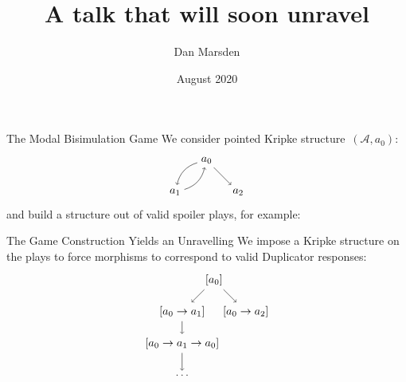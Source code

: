 \documentclass{beamer}
\title{A talk that will soon unravel}
\author{Dan Marsden}
\date{August 2020}
\newcommand{\As}{\mathcal{A}}
\begin{document}
\begin{frame}
\maketitle
\end{frame}

\begin{frame}{The Modal Bisimulation Game}
    We consider pointed Kripke structure~$(\As, a_0)$:
    \begin{equation*}
        \begin{tikzpicture}
        \path node(a0) {$a_0$} +(-1,-1) node (a1) {$a_1$} +(1,-1) node(a2) {$a_2$};
        \path[->] 
        (a0) edge[bend right] (a1)
        (a1) edge[bend right] (a0)
        (a0) edge (a2);
        \end{tikzpicture}
    \end{equation*}
    and build a structure out of valid spoiler plays, for example:
    \begin{equation*}
        [a_0 \rightarrow a_1 \rightarrow a_0 \rightarrow a_2]
    \end{equation*}
\end{frame}

\begin{frame}{The Game Construction Yields an Unravelling}
    We impose a Kripke structure on the plays to force morphisms to correspond to valid Duplicator responses:
    \begin{equation*}
        \begin{tikzpicture}
        \path 
        node (a) {$[a_0]$} +(-1,-1) 
        node (b) {$[a_0 \rightarrow a_1]$} ++(1,-1)
        node (c) {$[a_0 \rightarrow a_2]$} (b) ++(0,-1)
        node (a') {$[a_0 \rightarrow a_1 \rightarrow a_0]$} ++(0,-1)
        node (dots) {$\ldots$};
        \path[->]
        (a) edge (b)
        (a) edge (c)
        (b) edge (a')
        (a') edge (dots);
        \end{tikzpicture}
    \end{equation*}
\end{frame}
\end{document}
